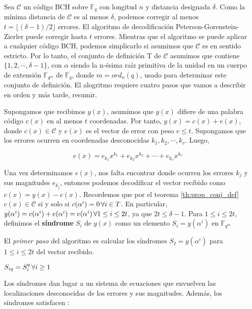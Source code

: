 Sea $\mathcal{C}$ un código BCH sobre $\mathbb{F}_q$ con longitud $n$ y distancia designada $\delta$. Como la mínima distancia de $\mathcal{C}$ es al menos $\delta$, podemos corregir al menos $t = \lfloor (\delta-1)/2 \rfloor$ errores. El algoritmo de decodificación Peterson-Gorenstein-Zierler puede corregir hasta $t$ errores. Mientras que el algoritmo se puede aplicar a cualquier código BCH, podemos simplicarlo si asumimos que $\mathcal{C}$ es en sentido estricto. Por lo tanto, el conjunto de definición T de $\mathcal{C}$ asumimos que contiene $\{ 1,2,\cdots,\delta-1 \}$, con $\alpha$ siendo la n-ésima raíz primitiva de la unidad en un cuerpo de extensión $\mathbb{F}_{q^m}$ de $\mathbb{F}_q$, donde $m = ord_n(q)$, usado para determinar este conjunto de definición. El alogritmo requiere cuatro pasos que vamos a describir  en orden y más tarde, resumir.


Supongamos que recibimos $y(x)$, asumimos que $y(x)$ difiere de una palabra código $c(x)$ en al menos $t$ coordenadas. Por tanto, $y(x) = c(x) + e(x)$, donde $c(x) \in \mathcal{C}$ y $e(x)$ es el vector de error con peso $v \leq t$. Supongamos que los errores ocurren en coordenadas desconocidas $k_1,k_2,\cdots,k_v$. Luego,

\[
e(x) = e_{k_1}x^{k_1} + e_{k_2}x^{k_2} + \cdots + e_{k_v}x^{k_v}
\]

Una vez determinamos $e(x)$, nos falta encontrar donde ocurren los errores $k_j$ y sus magnitudes $e_{k_j}$, entonces podemos decodificar el vector recibido como $c(x) = y(x) - e(x)$. Recordemos que por el teorema \ref{th:prop_conj_def} $c(x) \in \mathcal{C}$ si y solo si $c(\alpha^i) = 0 \thinspace \forall i \in T$. En particular, $y(\alpha^i) = c(\alpha^i) + e(\alpha^i) = e(\alpha^i) \thinspace \forall 1 \leq i \leq 2t$, ya que $2t \leq \delta-1$. Para $1 \leq i \leq 2t$, definimos el \textbf{síndrome} $S_i$ de $y(x)$ como un elemento $S_i = y(\alpha^i)$ en $\mathbb{F}_{q^m}$

El \textit{primer paso} del algoritmo es calcular los síndromes $S_I = y(\alpha^i)$ para $1 \leq i \leq 2t$ del vector recibido.

\begin{theorem}
\label{th:sindromes}
$S_{iq} = S_i^q \thinspace \forall i \geq 1$
\end{theorem}

Los síndromes dan lugar a un sistema de ecuaciones que envuelven las localizaciones desconocidas de los errores y sus magnitudes. Además, los síndromes satisfacen :


